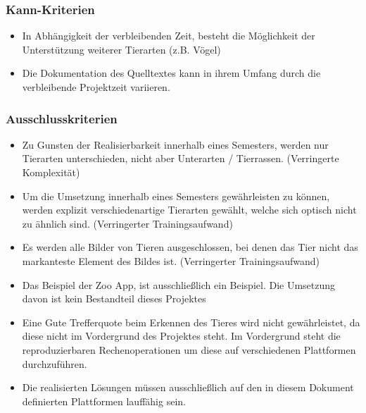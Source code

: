 \vspace{0.8cm}


\subsubsection{Kann-Kriterien}

\vspace{0.5cm}

\begin{itemize}
	\item In Abhängigkeit der verbleibenden Zeit, besteht die Möglichkeit der Unterstützung weiterer Tierarten (z.B. Vögel)
	\item Die Dokumentation des Quelltextes kann in ihrem Umfang durch die verbleibende Projektzeit variieren.
\end{itemize}

\vspace{0.8cm}


\subsubsection{Ausschlusskriterien}

\vspace{0.5cm}

\begin{itemize}
	\item Zu Gunsten der Realisierbarkeit innerhalb eines Semesters, werden nur Tierarten unterschieden, nicht aber Unterarten / Tierrassen. (Verringerte Komplexität)
	\item Um die Umsetzung innerhalb eines Semesters gewährleisten zu können, werden explizit verschiedenartige Tierarten gewählt, welche sich optisch nicht zu ähnlich sind. (Verringerter Trainingsaufwand)
	\item Es werden alle Bilder von Tieren ausgeschlossen, bei denen das Tier nicht das markanteste Element des Bildes ist. (Verringerter Trainingsaufwand)
	\item Das Beispiel der Zoo App, ist ausschließlich ein Beispiel. Die Umsetzung davon ist kein Bestandteil dieses Projektes
	\item Eine Gute Trefferquote beim Erkennen des Tieres wird nicht gewährleistet, da diese nicht im Vordergrund des Projektes steht. Im Vordergrund steht die reproduzierbaren Rechenoperationen um diese auf verschiedenen Plattformen durchzuführen.
	\item Die realisierten Lösungen müssen ausschließlich auf den in diesem Dokument definierten Plattformen lauffähig sein. 
\end{itemize}

